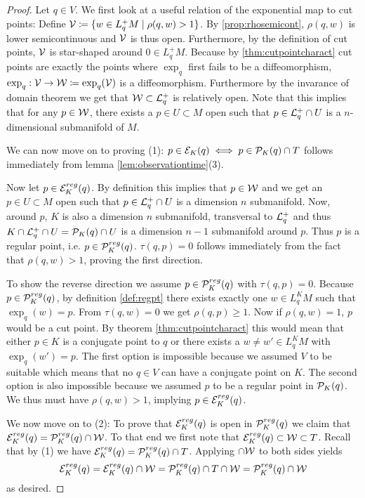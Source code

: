 \begin{proof}
Let $q\in V$. We first look at a useful relation of the exponential map to cut points: Define ${\mathcal{V}}\coloneqq \{w\in L^+_qM \mid \rho(q,w)>1\}$. By \ref{prop:rhosemicont}, $\rho(q,w)$ is lower semicontinuous and ${\mathcal{V}}$ is thus open. Furthermore, by the definition of cut points, ${\mathcal{V}}$ is star-shaped around $0\in L^+_qM$. Because by \ref{thm:cutpointcharact} cut points are exactly the points where $\exp_q$ first fails to be a diffeomorphism, $\exp_q:{\mathcal{V}}\to {\mathcal{W}}\coloneqq \exp_q({\mathcal{V}})$ is a diffeomorphism. Furthermore by the invarance of domain theorem we get that ${\mathcal{W}}\subset {\mathcal{L}}^+_q$ is relatively open. Note that this implies that for any $p\in {\mathcal{W}}$, there exists a $p\in U\subset M$ open such that $p\in{\mathcal{L}}^+_q\cap U$ is a $n$-dimensional submanifold of $M$.

We can now move on to proving (1): $p\in {\mathcal{E}}_K(q) \iff p\in {\mathcal{P}}_K(q) \cap T$ follows immediately from lemma \ref{lem:observationtime}(3).

Now let $p\in{\mathcal{E}}^{reg}_K(q)$. By definition this implies that $p\in {\mathcal{W}}$ and we get an $p\in U\subset M$ open such that $p\in{\mathcal{L}}^+_q\cap U$ is a dimension $n$ submanifold. Now, around $p$, $K$ is also a dimension $n$ submanifold, transversal to ${\mathcal{L}}^+_q$ and thus $K \cap {\mathcal{L}}^+_q \cap U = {{\mathcal{P}}_K(q)} \cap U$ is a dimension $n-1$ submanifold around $p$. Thus $p$ is a regular point, i.e. $p\in {\mathcal{P}}^{reg}_K(q)$. $\tau(q,p)=0$ follows immediately from the fact that $\rho(q,w)>1$, proving the first direction.

To show the reverse direction we assume $p\in {\mathcal{P}}^{reg}_K(q)$ with $\tau(q,p)=0$.
Because $p\in {\mathcal{P}}^{reg}_K(q)$, by definition \ref{def:regpt} there exists exactly one $w\in L^K_qM$ such that $\exp_q(w)=p$. From $\tau(q,w)=0$ we get $\rho(q,p)\ge 1$. Now if $\rho(q,w)=1$, $p$ would be a cut point. By theorem \ref{thm:cutpointcharact} this would mean that either $p\in K$ is a conjugate point to $q$ or there exists a $w\neq w'\in L^K_qM$ with $\exp_q(w')=p$. The first option is impossible because we assumed $V$ to be suitable which means that no $q\in V$ can have a conjugate point on $K$. The second option is also impossible because we assumed $p$ to be a regular point in ${\mathcal{P}}_K(q)$. We thus must have $\rho(q,w)>1$, implying $p\in {\mathcal{E}}^{reg}_K(q)$.

We now move on to (2): To prove that ${\mathcal{E}}^{reg}_K(q)$ is open in ${\mathcal{P}}^{reg}_K(q)$ we claim that ${\mathcal{E}}^{reg}_K(q)={\mathcal{P}}^{reg}_K(q)\cap {\mathcal{W}}$. To that end we first note that ${\mathcal{E}}_K^{reg}(q)\subset {\mathcal{W}} \subset T$. Recall that by (1) we have ${\mathcal{E}}_K^{reg}(q) = {\mathcal{P}}_K^{reg}(q) \cap T$. Applying $\cap {\mathcal{W}}$ to both sides yields
\[
    {\mathcal{E}}_K^{reg}(q) = {\mathcal{E}}_K^{reg}(q) \cap {\mathcal{W}} = {\mathcal{P}}_K^{reg}(q) \cap T \cap {\mathcal{W}} = {\mathcal{P}}_K^{reg}(q) \cap {\mathcal{W}}
\] as desired.


\end{proof}
